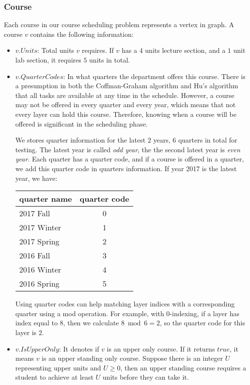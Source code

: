 \documentclass[letterpaper,12pt]{article}
\theoremstyle{definition}
\begin{document}
\subsubsection{Course}
Each course in our course scheduling problem represents a vertex in graph. A course $v$ contains the following information:
\begin{itemize}
    \item $v.Units$: Total units $v$ requires. If $v$ has a $4$ units lecture section, and a $1$ unit lab section, it requires $5$ units in total.
    \item $v.QuarterCodes$: In what quarters the department offers this course. There is a presumption in both the Coffman-Graham algorithm and Hu's algorithm that all tasks are available at any time in the schedule. However, a course may not be offered in every quarter and every year, which means that not every layer can hold this course. Therefore, knowing when a course will be offered is significant in the scheduling phase.
    
    We stores quarter information for the latest $2$ years, $6$ quarters in total for testing. The latest year is called \textit{odd year}, the the second latest year is \textit{even year}. Each quarter has a quarter code, and if a course is offered in a quarter, we add this quarter code in quarters information. If year 2017 is the latest year, we have:
    \begin{center}
    \begin{tabular}{ |l|c| } 
         \hline
         quarter name & quarter code \\
         \hline
         2017 Fall & 0 \\ 
         2017 Winter & 1 \\ 
         2017 Spring & 2 \\ 
         2016 Fall & 3 \\
         2016 Winter & 4 \\
         2016 Spring & 5 \\
         \hline
    \end{tabular}
    \end{center}
    Using quarter codes can help matching layer indices with a corresponding quarter using a mod operation. For example, with 0-indexing, if a layer has index equal to $8$, then we calculate $8 \bmod 6 = 2$, so the quarter code for this layer is $2$. 
    \item $v.IsUpperOnly$: It denotes if $v$ is an upper only course. If it returns $true$, it means $v$ is an upper standing only course. Suppose there is an integer $U$ representing upper units and $U \geq 0$, then an upper standing course requires a student to achieve at least $U$ units before they can take it. 
    

\end{itemize}
\end{document}
